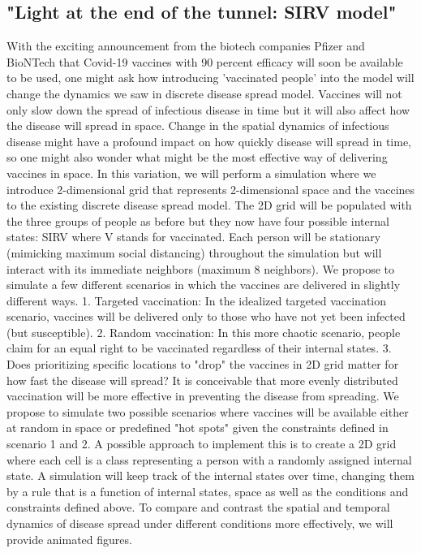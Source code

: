 \documentclass[12pt, reqno]{amsart}
\begin{document}
\subsection{"Light at the end of the tunnel: SIRV model"}

	With the exciting announcement from the biotech companies Pfizer and BioNTech that Covid-19 vaccines with 90 percent efficacy will soon be available to be used, one might ask how introducing 'vaccinated people' into the model will change the dynamics we saw in discrete disease spread model. Vaccines will not only slow down the spread of infectious disease in time but it will also affect how the disease will spread in space. Change in the spatial dynamics of infectious disease might have a profound impact on how quickly disease will spread in time, so one might also wonder what might be the most effective way of delivering vaccines in space.
	In this variation, we will perform a simulation where we introduce 2-dimensional grid that represents 2-dimensional space and the vaccines to the existing discrete disease spread model. The 2D grid will be populated with the three groups of people as before but they now have four possible internal states: SIRV where V stands for vaccinated. Each person will be stationary (mimicking maximum social distancing) throughout the simulation but will interact with its immediate neighbors (maximum 8 neighbors). We propose to simulate a few different scenarios in which the vaccines are delivered in slightly different ways.
	1. Targeted vaccination: In the idealized targeted vaccination scenario, vaccines will be delivered only to those who have not yet been infected (but susceptible). 
	2. Random vaccination: In this more chaotic scenario, people claim for an equal right to be vaccinated regardless of their internal states.  
	3. Does prioritizing specific locations to "drop" the vaccines in 2D grid matter for how fast the disease will spread? It is conceivable that more evenly distributed vaccination will be more effective in preventing the disease from spreading. We propose to simulate two possible scenarios where vaccines will be available either at random in space or predefined "hot spots" given the constraints defined in scenario 1 and 2. 
	A possible approach to implement this is to create a 2D grid where each cell is a class representing a person with a randomly assigned internal state. A simulation will keep track of the internal states over time, changing them by a rule that is a function of internal states, space as well as the conditions and constraints defined above. To compare and contrast the spatial and temporal dynamics of disease spread under different conditions more effectively, we will provide animated figures.	

    
    
\end{document}
